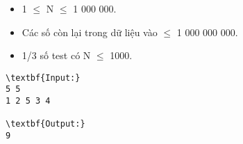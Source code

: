 \begin{itemize}
	\item 1  $\le$  N  $\le$  1 000 000.
	\item Các số còn lại trong dữ liệu vào  $\le$  1 000 000 000.
	\item 1/3 số test có N  $\le$  1000.
\end{itemize}
\begin{verbatim}
\textbf{Input:}
5 5
1 2 5 3 4

\textbf{Output:}
9

\end{verbatim}